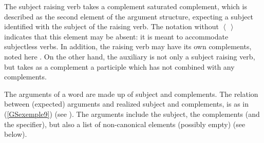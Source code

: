 \documentclass[output=paper]{langsci/langscibook}
\begin{document}
{\begin{exe}
	\ex 	\label{GSexemple8}
	\begin{xlist}
	
	\end{xlist}
\end{exe}

The subject raising verb takes a complement saturated complement, which is described as the second element of the argument structure, expecting a subject  identified with the subject of the raising verb. The notation  without $\left< \, \right>$ indicates that this element may be absent: it is meant to accommodate subjectless verbs. In addition, the raising verb may have its own complements, noted here . On the other hand, the auxiliary is not only a subject raising verb, but takes as a complement a participle which has not combined with any complements.

The arguments of a word are made up of subject and complements. The relation between (expected) arguments and realized subject and complements, is as in (\ref{GSexemple9}) (see \citealt{ginzburg2000interrogative, bouma2001satisfying}). The arguments include the subject, the complements (and the specifier), but also a list of non-canonical elements (possibly empty) (see below).

\begin{exe}
\end{exe}

}
\end{document}
